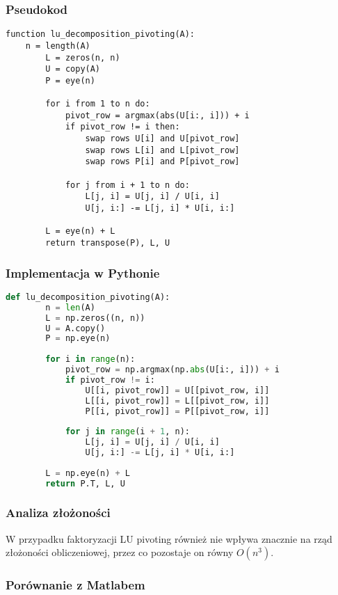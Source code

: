 \documentclass[12pt,a4paper,table]{article}
\begin{document}
    \subsubsection{Pseudokod}
    \begin{lstlisting}[]
    function lu_decomposition_pivoting(A):
    n = length(A)
        L = zeros(n, n)
        U = copy(A)
        P = eye(n)
    
        for i from 1 to n do:
            pivot_row = argmax(abs(U[i:, i])) + i
            if pivot_row != i then:
                swap rows U[i] and U[pivot_row]
                swap rows L[i] and L[pivot_row]
                swap rows P[i] and P[pivot_row]
    
            for j from i + 1 to n do:
                L[j, i] = U[j, i] / U[i, i]
                U[j, i:] -= L[j, i] * U[i, i:]
    
        L = eye(n) + L
        return transpose(P), L, U

    \end{lstlisting}
    \subsubsection{Implementacja w Pythonie}
    \begin{lstlisting}[language=Python]
    def lu_decomposition_pivoting(A):
        n = len(A)
        L = np.zeros((n, n))
        U = A.copy()
        P = np.eye(n)
    
        for i in range(n):
            pivot_row = np.argmax(np.abs(U[i:, i])) + i
            if pivot_row != i:
                U[[i, pivot_row]] = U[[pivot_row, i]]
                L[[i, pivot_row]] = L[[pivot_row, i]]
                P[[i, pivot_row]] = P[[pivot_row, i]]
    
            for j in range(i + 1, n):
                L[j, i] = U[j, i] / U[i, i]
                U[j, i:] -= L[j, i] * U[i, i:]
    
        L = np.eye(n) + L
        return P.T, L, U
    \end{lstlisting}
    \subsubsection{Analiza złożoności}
    W przypadku faktoryzacji LU pivoting również nie wpływa znacznie na rząd złożoności obliczeniowej, przez co pozostaje on równy \( O(n^3) \).
    \subsubsection{Porównanie z Matlabem}
    
\end{document}

